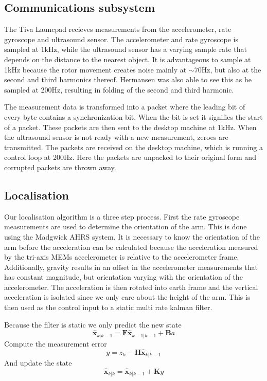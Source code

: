 \subsection{Communications subsystem}\label{sec:comms}
The Tiva Launcpad recieves measurements from the accelerometer, rate gyroscope and ultrasound sensor. The accelerometer and 
rate gyroscope is sampled at 1kHz, while the ultrasound sensor has a varying sample rate that depends on the distance to the nearest
object.
It is advantageous to sample at 1kHz because the rotor movement creates noise mainly at \(\sim\)70Hz, but also at the second and 
third harmonics thereof. Hermansen was also able to see this as he sampled at 200Hz, resulting in folding of the second and third
harmonic.

The measurement data is transformed into a packet where the leading bit of every byte contains a synchronization bit. When
the bit is set it signifies the start of a packet. These packets are then sent to the desktop machine at 1kHz. When the ultrasound 
sensor is not ready with a new measurement, zeroes are transmitted. The packets are received on the desktop machine, which is 
running a control loop at 200Hz. Here the packets are unpacked to their original form and corrupted packets are thrown away.
\subsection{Localisation}\label{sec:localisation}
Our localisation algorithm is a three step process. First the rate gyroscope measurements are used to determine the orientation of
the arm. This is done using the Madgwick AHRS system\cite{Madgwick2011}. It is necessary to know the orientation of the arm before
the acceleration can be calculated because the acceleration measured by the tri-axis MEMs accelerometer is relative to the 
accelerometer frame. Additionally, gravity results in an offset in the accelerometer measurements that has constant magnitude, but
orientation varying with the orientation of the accelerometer. The acceleration is then rotated into earth frame and the vertical
acceleration is isolated since we only care about the height of the arm.
This is then used as the control input to a static multi rate kalman filter\cite{Welch2006}.

Because the filter is static we
only predict the new state 
\begin{equation*}
	\hat{\mathbf{x}}_{k\vert k-1} = \mathbf{F}\hat{\mathbf{x}}_{k-1\vert k-1} + \mathbf{B}a
\end{equation*}
Compute the measurement error 
\begin{equation*}
	y = z_k - \mathbf{H}\hat{\mathbf{x}}_{k\vert k-1} 
\end{equation*}
And update the state
\begin{equation*}
	\hat{\mathbf{x}}_{k\vert k} = \hat{\mathbf{x}}_{k\vert k-1} + \mathbf{K} y
\end{equation*}

